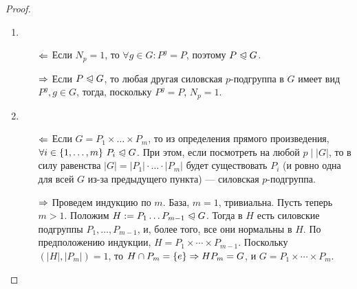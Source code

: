 \begin{proof}~
	\begin{enumerate}
		\item \begin{itemize}
			\item[$\Leftarrow$] Если $N_p = 1$, то $\forall g \in G: P^g = P$, поэтому $P \trianglelefteqslant G$.
			
			\item[$\Rightarrow$] Если $P \trianglelefteqslant G$, то любая другая силовская $p$-подгруппа в $G$ имеет вид $P^g, g \in G$, тогда, поскольку $P^g = P$, $N_p = 1$.
		\end{itemize}
		
		\item \begin{itemize}
			\item[$\Leftarrow$] Если $G = P_1 \times \ldots \times P_m$, то из определения прямого произведения, $\forall i \in \{1, \ldots, m\}\ P_i \trianglelefteqslant G$. При этом, если посмотреть на любой $p \mid |G|$, то в силу равенства $|G| = |P_1| \cdot \ldots \cdot |P_m|$ будет существовать $P_i$ (и ровно одна для всей $G$ из-за предыдущего пункта) --- силовская $p$-подгруппа.
			
			\item[$\Rightarrow$] Проведем индукцию по $m$. База, $m = 1$, тривиальна. Пусть теперь $m > 1$. Положим $H := P_1\dots P_{m - 1} \trianglelefteqslant G$. Тогда в $H$ есть силовские подгруппы $P_1, \ldots, P_{m - 1}$, и, более того, все они нормальны в $H$. По предположению индукции, $H = P_1 \times \dotsb \times P_{m-1}$. Поскольку $(|H|, |P_m|) = 1$, то $H \cap P_m = \{e\} \Rightarrow HP_m = G$, и $G = P_1 \times \dotsb \times P_m$.
		\end{itemize}
	\end{enumerate}
\end{proof}